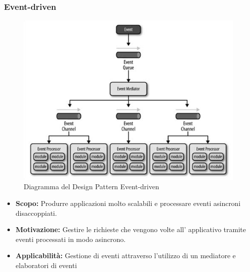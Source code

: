 \documentclass[a4paper]{article}
\begin{document}
	\subsubsection{Event-driven}
				\begin{figure}[H]
					\centering
					\includegraphics[scale=0.65]{immagini/ST/schemaevent-driven.png}
					\caption{Diagramma del Design Pattern Event-driven}
				\end{figure}
            \begin{itemize}
				\item \textbf{Scopo:}
					Produrre applicazioni molto scalabili e processare eventi asincroni disaccoppiati.
                \item \textbf{Motivazione:} Gestire le richieste che vengono volte all' applicativo tramite eventi processati in modo asincrono.
                \item \textbf{Applicabilità:}
                	Gestione di eventi attraverso l'utilizzo di un mediatore e elaboratori di eventi		
			\end{itemize}
\end{document}
